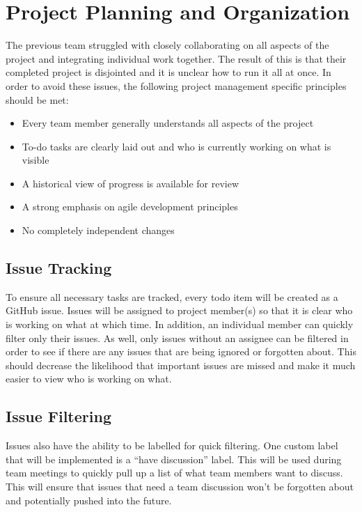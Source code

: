 \documentclass[12pt]{report}
\begin{document}

\section{Project Planning and Organization}
The previous team struggled with closely collaborating on all aspects of the project and integrating individual work together. The result of this is that their completed project is disjointed and it is unclear how to run it all at once. In order to avoid these issues, the following project management specific principles should be met:
\begin{itemize}
\itemsep0em 
    \item Every team member generally understands all aspects of the project
    \item To-do tasks are clearly laid out and who is currently working on what is visible
    \item A historical view of progress is available for review
    \item A strong emphasis on agile development principles
    \item No completely independent changes
\end{itemize}
\subsection{Issue Tracking}
To ensure all necessary tasks are tracked, every todo item will be created as a GitHub issue. Issues will be assigned to project member(s) so that it is clear who is working on what at which time. In addition, an individual member can quickly filter only their issues. As well, only issues without an assignee can be filtered in order to see if there are any issues that are being ignored or forgotten about. This should decrease the likelihood that important issues are missed and make it much easier to view who is working on what.
\subsection{Issue Filtering}
Issues also have the ability to be labelled for quick filtering. One custom label that will be implemented is a “have discussion” label. This will be used during team meetings to quickly pull up a list of what team members want to discuss. This will ensure that issues that need a team discussion won’t be forgotten about and potentially pushed into the future.
\end{document}
